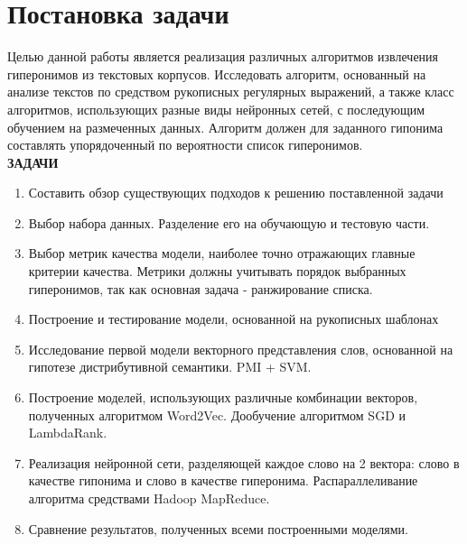 \section{Постановка задачи}
\label{sec:Chapter_1} 
\large

Целью данной работы является реализация различных алгоритмов извлечения
гиперонимов из текстовых корпусов. Исследовать алгоритм, основанный на анализе
текстов по средством рукописных регулярных выражений, а также класс алгоритмов,
использующих разные виды нейронных сетей, с последующим обучением на размеченных
данных.
Алгоритм должен для заданного гипонима составлять упорядоченный по вероятности
список гиперонимов.\\



\textbf{ЗАДАЧИ}

\begin{enumerate}
\item Составить обзор существующих подходов к решению поставленной задачи
\item Выбор набора данных. Разделение его на обучающую и тестовую части.
\item Выбор метрик качества модели, наиболее точно отражающих главные критерии
качества. Метрики должны учитывать порядок выбранных гиперонимов, так как
основная задача - ранжирование списка.
\item Построение и тестирование модели, основанной на рукописных шаблонах
\item Исследование первой модели векторного представления слов, основанной на гипотезе
дистрибутивной семантики. PMI + SVM.
\item Построение моделей, использующих различные комбинации векторов, полученных
алгоритмом Word2Vec. Дообучение алгоритмом SGD и LambdaRank.
\item Реализация нейронной сети, разделяющей каждое слово на 2 вектора: слово в
качестве гипонима и слово в качестве гиперонима. Распараллеливание алгоритма
средствами Hadoop MapReduce.
\item Сравнение результатов, полученных всеми построенными моделями.
\end{enumerate}

